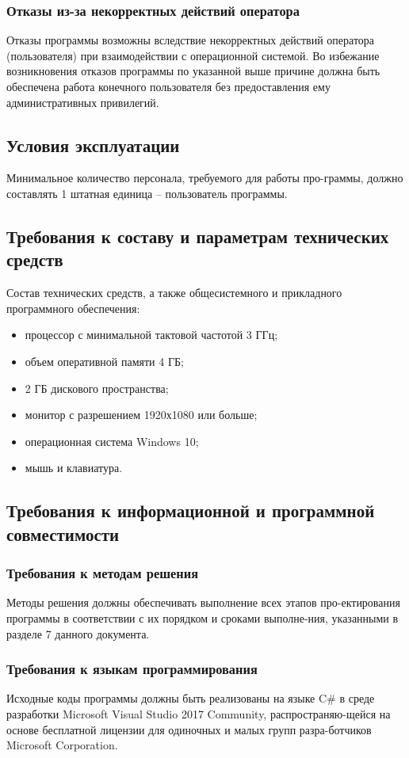 \documentclass[14pt]{extarticle}        %
\begin{document}
\subsubsection {Отказы из-за некорректных действий оператора}
Отказы программы возможны вследствие некорректных действий оператора (пользователя) при взаимодействии с операционной системой. Во избежание возникновения отказов программы по указанной выше причине должна быть обеспечена работа конечного пользователя без предоставления ему административных привилегий.

\subsection {Условия эксплуатации}
Минимальное количество персонала, требуемого для работы про-граммы, должно составлять 1 штатная единица – пользователь программы.

\subsection {Требования к составу и параметрам технических средств}
Состав технических средств, а также общесистемного и прикладного программного обеспечения:
\begin{itemize}
    \item процессор с минимальной тактовой частотой 3 ГГц;
    \item объем оперативной памяти 4 ГБ; 
    \item 2 ГБ дискового пространства;
    \item монитор с разрешением 1920х1080 или больше;
    \item операционная система Windows 10;
    \item мышь и клавиатура.
\end{itemize}

\subsection {Требования к информационной и программной совместимости}
\subsubsection {Требования к методам решения}
Методы решения должны обеспечивать выполнение всех этапов про-ектирования программы в соответствии с их порядком и сроками выполне-ния, указанными в разделе 7 данного документа.
\subsubsection {Требования к языкам программирования}
Исходные коды программы должны быть реализованы на языке C# в среде разработки Microsoft Visual Studio 2017 Community, распространяю-щейся на основе бесплатной лицензии для одиночных и малых групп разра-ботчиков Microsoft Corporation.
\end{document}
